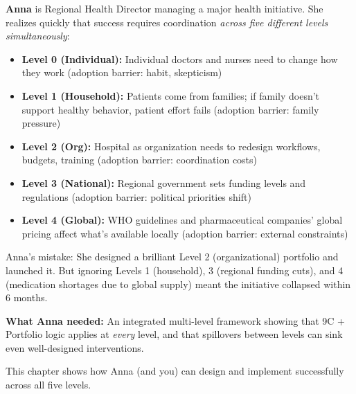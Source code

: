 
\begin{tcolorbox}[colback=yellow!5!white, colframe=yellow!75!black, title=Intuition: Anna Leads Organizational Change Across Levels]

\textbf{Anna} is Regional Health Director managing a major health initiative. She realizes quickly that success requires coordination \emph{across five different levels simultaneously}:

\begin{itemize}[nosep]
\item \textbf{Level 0 (Individual):} Individual doctors and nurses need to change how they work (adoption barrier: habit, skepticism)
\item \textbf{Level 1 (Household):} Patients come from families; if family doesn't support healthy behavior, patient effort fails (adoption barrier: family pressure)
\item \textbf{Level 2 (Org):} Hospital as organization needs to redesign workflows, budgets, training (adoption barrier: coordination costs)
\item \textbf{Level 3 (National):} Regional government sets funding levels and regulations (adoption barrier: political priorities shift)
\item \textbf{Level 4 (Global):} WHO guidelines and pharmaceutical companies' global pricing affect what's available locally (adoption barrier: external constraints)
\end{itemize}

Anna's mistake: She designed a brilliant Level 2 (organizational) portfolio and launched it. But ignoring Levels 1 (household), 3 (regional funding cuts), and 4 (medication shortages due to global supply) meant the initiative collapsed within 6 months.

\textbf{What Anna needed:} An integrated multi-level framework showing that 9C + Portfolio logic applies at \emph{every} level, and that spillovers between levels can sink even well-designed interventions.

This chapter shows how Anna (and you) can design and implement successfully across all five levels.

\end{tcolorbox}


